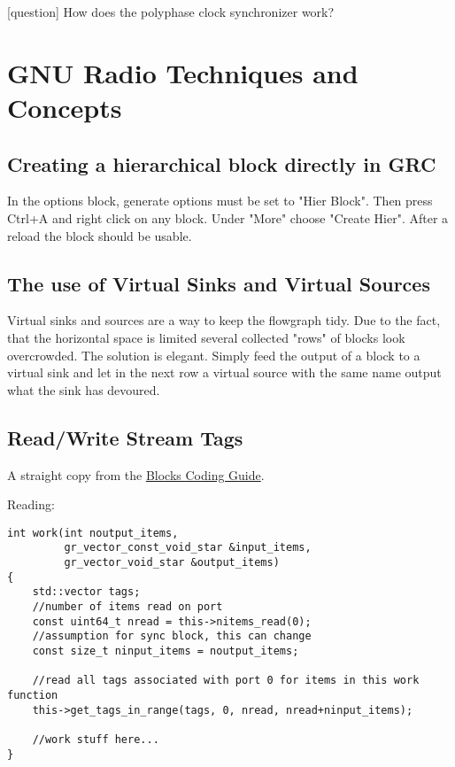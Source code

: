 \documentclass{article}
\begin{document}
\bigskip

\color{blue}
[question] How does the polyphase clock synchronizer work?
\color{black}

\section{GNU Radio Techniques and Concepts}

\subsection{Creating a hierarchical block directly in GRC}

In the options block, generate options must be set to "Hier Block". Then press Ctrl+A and right click on any block. Under "More" choose "Create Hier". After a reload the block should be usable.

\subsection{The use of Virtual Sinks and Virtual Sources}

Virtual sinks and sources are a way to keep the flowgraph tidy. Due to the fact, that the horizontal space is limited several collected "rows" of blocks look overcrowded. The solution is elegant. Simply feed the output of a block to a virtual sink and let in the next row a virtual source with the same name output what the sink has devoured.

\subsection{Read/Write Stream Tags}

A straight copy from the \href{https://wiki.gnuradio.org/index.php/BlocksCodingGuide}{Blocks Coding Guide}.

\bigskip

Reading:
\begin{verbatim}
int work(int noutput_items,
         gr_vector_const_void_star &input_items,
         gr_vector_void_star &output_items)
{
	std::vector tags;
	//number of items read on port
	const uint64_t nread = this->nitems_read(0);
	//assumption for sync block, this can change
	const size_t ninput_items = noutput_items; 
	
	//read all tags associated with port 0 for items in this work function
	this->get_tags_in_range(tags, 0, nread, nread+ninput_items);
	
	//work stuff here...
}
\end{verbatim}
\end{document}
